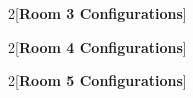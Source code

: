 \documentclass{article}
\begin{document}
\pagebreak

\begin{multicols}{2}[\textbf{Room 3 Configurations}]

\end{multicols}

\pagebreak

\begin{multicols}{2}[\textbf{Room 4 Configurations}]

\end{multicols}

\pagebreak

\begin{multicols}{2}[\textbf{Room 5 Configurations}]

\end{multicols}
\end{document}
